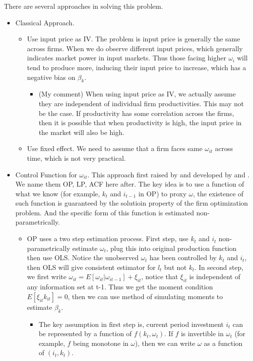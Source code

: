 \documentclass{book}
\theoremstyle{plain}
\theoremstyle{definition}
\begin{document}
There are several approaches in solving this problem.

\begin{itemize}
	\item Classical Approach.
	\begin{itemize}
		\item Use input price as IV. The problem is input price is generally the same across firms. When we do observe different input prices, which generally indicates market power in input markets. Thus those facing higher $\omega_i$ will tend to produce more, inducing their input price to increase, which has a negative bias on $\beta_k$.
		\begin{itemize}
			\item (My comment) When using input price as IV, we actually assume they are independent of individual firm productivities.
			This may not be the case.
			If productivity has some correlation across the firms,
			then it is possible that when productivity is high,
			the input price in the market will also be high.
		\end{itemize}
		\item Use fixed effect. We need to assume that a firm faces same $\omega_{it}$ across time, which is not very practical.
	\end{itemize}
	\item Control Function for  $\omega_{it}$. This approach first raised by \cite{Olley:1996ef} and developed by \cite{Levinsohn:2003ej} and \cite*{Ackerberg:2015ha}. We name them OP, LP, ACF here after. The key idea is to use a function of what we know (for example, $k_t$ and $i_{t-1}$ in OP) to proxy $\omega$, the existence of such function is guaranteed by the solutioin property of the firm optimization problem. And the specific form of this function is estimated non-parametrically.
	\begin{itemize}
		\item OP uses a two step estimation process. First step, use $k_t$ and $i_{t}$ non-parametrically estimate $\omega_t$, plug this into original production function then use OLS. Notice the unobserved $\omega_t$ has been controlled by $k_t$ and $i_{t}$, then OLS will give consistent estimator for $l_t$ but not $k_t$. In second step, we first write $\omega_{it} = E[\omega_{it}|\omega_{it-1}]+\xi_{it}$, notice that $\xi_{it}$ is independent of any information set at t-1. Thus we get the moment condition $E[\xi_{it}k_{it}]=0$, then we can use method of simulating moments to estimate $\beta_k$.
		\begin{itemize}
			\item The key assumption in first step is, current period investment $i_t$ can be represented by a function of $f(k_t,\omega_t)$. 
			If $f$ is invertible in $\omega_t$ (for example, $f$ being monotone in $\omega$), then we can write $\omega$ as a function of $(i_t, k_t)$.
		\end{itemize}


\end{itemize}
\end{itemize}
\end{document}
